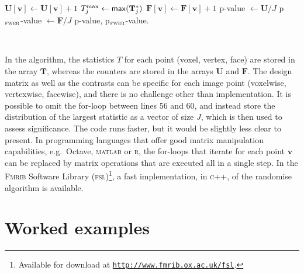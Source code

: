 {\begin{algorithmic}[1]
\State $\mathbf{U}[\mathbf{v}] \leftarrow \mathbf{U}[\mathbf{v}]+1$
\EndIf
\EndFor
\State $T^{\text{max}}_{j} \leftarrow \text{\textsf{max}}(\mathbf{T}_{j}^{*})$
\State $\mathbf{F}[\mathbf{v}] \leftarrow \mathbf{F}[\mathbf{v}]+1$
\EndIf
\EndFor
\EndFor
\State p-value $\leftarrow \mathbf{U} / J$
\State p$_{\text{\textsc{fwer}}}$-value $\leftarrow \mathbf{F} / J$
\State \Return p-value, p$_{\text{\textsc{fwer}}}$-value.
\EndFor
\end{algorithmic}}
\noindent
\HRule\\
\setstretch{\lspac}
\vspace{0mm}

In the algorithm, the statistics $T$ for each point (voxel, vertex, face) are stored in the array $\mathbf{T}$, whereas the counters are stored in the arrays $\mathbf{U}$ and $\mathbf{F}$. The design matrix as well as the contrasts can be specific for each image point (voxelwise, vertexwise, facewise), and there is no challenge other than implementation. It is possible to omit the for-loop between lines 56 and 60, and instead store the distribution of the largest statistic as a vector of size $J$, which is then used to assess significance. The code runs faster, but it would be slightly less clear to present. In programming languages that offer good matrix manipulation capabilities, e.g.\ Octave, \textsc{matlab} or \textsc{r}, the for-loops that iterate for each point $\mathbf{v}$ can be replaced by matrix operations that are executed all in a single step. In the \textsc{Fmrib} Software Library (\textsc{fsl})\footnote{Available for download at \href{http://www.fmrib.ox.ac.uk/fsl}{\texttt{http://www.fmrib.ox.ac.uk/fsl}}.}, a fast implementation, in \textsc{c}++, of the randomise algorithm is available.

\section{Worked examples}
\label{sec:perm:examples}

